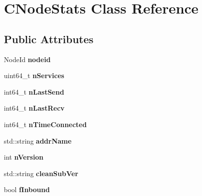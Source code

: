 \hypertarget{class_c_node_stats}{}\section{C\+Node\+Stats Class Reference}
\label{class_c_node_stats}
\subsection*{Public Attributes}
\begin{DoxyCompactItemize}
\item 
\mbox{\label{class_c_node_stats_ad2bceab1a335d59f42af37178b72fee7}} 
Node\+Id {\bfseries nodeid}
\item 
\mbox{\label{class_c_node_stats_a3c56fe96daccb9339314953d249dfa15}} 
uint64\+\_\+t {\bfseries n\+Services}
\item 
\mbox{\label{class_c_node_stats_adc88b64389f26227db58ed86058d2e1a}} 
int64\+\_\+t {\bfseries n\+Last\+Send}
\item 
\mbox{\label{class_c_node_stats_a67b3cd5817ad20bfb2d9eb1583f1deb5}} 
int64\+\_\+t {\bfseries n\+Last\+Recv}
\item 
\mbox{\label{class_c_node_stats_a3d5133369e51db3c45839c8a68c662d1}} 
int64\+\_\+t {\bfseries n\+Time\+Connected}
\item 
\mbox{\label{class_c_node_stats_a3299ecdae870c367fe657f3f59b27e43}} 
std\+::string {\bfseries addr\+Name}
\item 
\mbox{\label{class_c_node_stats_ac8892d29d7c246e34e78fbc15ae77276}} 
int {\bfseries n\+Version}
\item 
\mbox{\label{class_c_node_stats_ad733b840ac9a16a7eb6166ea4984d8a8}} 
std\+::string {\bfseries clean\+Sub\+Ver}
\item 
\mbox{\label{class_c_node_stats_a34627c46cac7bc2bfb3406c954522b49}} 
bool {\bfseries f\+Inbound}
\item 
\mbox{\label{class_c_node_stats_a86ff627e31f8ab881a8e11bb3acf4f19}} 

\end{DoxyCompactItemize}
